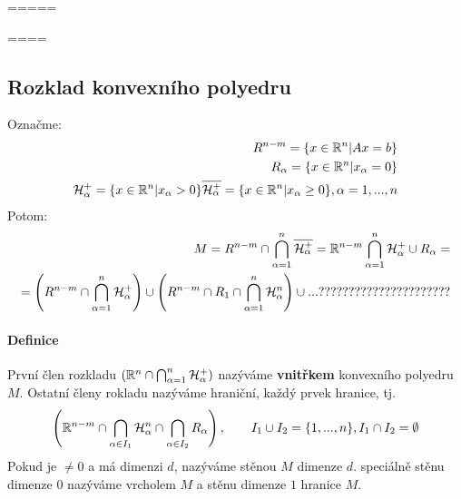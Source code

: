 \documentclass[a4paper,12pt,titlepage]{article}
\begin{document}
=====

====


\subsection{Rozklad konvexního polyedru}
\setcounter{equation}{0}
Označme:
\begin{align}
	R^{n-m} = \{ x \in \mathbb{R}^n | Ax = b \} \\
	R_\alpha = \{ x \in \mathbb{R}^n | x_\alpha = 0 \} \\
	\mathcal{H}_\alpha^+ = \{ x \in \mathbb{R}^n | x_\alpha > 0 \}
	\overline{\mathcal{H}_\alpha^+} = \{ x \in \mathbb{R}^n | x_\alpha \ge 0 \}, \alpha
	= 1, ..., n
\end{align}
Potom:
\begin{align}
M = R^{n-m} \cap \bigcap_{\alpha=1}^n \overline{\mathcal{H}_\alpha^+} =
\mathbb{R}^{n-m} \bigcap_{\alpha=1}^n \mathcal{H}_\alpha^+ \cup R_\alpha = \\
	= \left( R^{n-m} \cap \bigcap_{\alpha=1}^n \mathcal{H}_\alpha^+ \right) \cup
	\left( R^{n-m} \cap R_1 \cap \bigcap_{\alpha=1}^n \mathcal{H}_\alpha^n
	\right) \cup ... ??????????????????????
\end{align}
\paragraph{Definice}
První člen rozkladu $(\mathbb{R}^n \cap \bigcap_{\alpha=1}^n \mathcal{H}_\alpha^+)$
nazýváme \textbf{vnitřkem} konvexního polyedru $M$. Ostatní členy rokladu
nazýváme hraniční, každý prvek hranice, tj. 
\begin{align}
	\left( \mathbb{R}^{n-m} \cap \bigcap_{\alpha \in I_1} \mathcal{H}_\alpha^n \cap
	\bigcap_{\alpha \in I_2} R_\alpha \right), \qquad I_1 \cup I_2 = \{ 1, ...,
	n\}, I_1 \cap I_2 = \emptyset
\end{align}
Pokud je $\neq 0$ a má dimenzi $d$, nazýváme stěnou $M$ dimenze $d$. speciálně stěnu
dimenze $0$ nazýváme vrcholem $M$ a stěnu dimenze $1$ hranice $M$.
\end{document}
